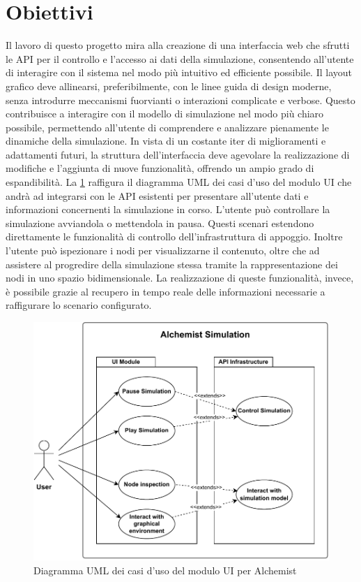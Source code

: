 \section{Obiettivi}
Il lavoro di questo progetto mira alla creazione di una interfaccia web che sfrutti le \ac{API} per il controllo e l'accesso ai dati della simulazione, consentendo all'utente di interagire con il sistema nel modo più intuitivo ed efficiente possibile. Il layout grafico deve allinearsi, preferibilmente, con le linee guida di design moderne, senza introdurre meccanismi fuorvianti o interazioni complicate e verbose. Questo contribuisce a interagire con il modello di simulazione nel modo più chiaro possibile, permettendo all'utente di comprendere e analizzare pienamente le dinamiche della simulazione.
In vista di un costante iter di miglioramenti e adattamenti futuri, la struttura dell'interfaccia deve agevolare la realizzazione di modifiche e l'aggiunta di nuove funzionalità, offrendo un ampio grado di espandibilità.
La \cref{fig:use-cases} raffigura il diagramma UML dei casi d'uso del modulo UI che andrà ad integrarsi con le \ac{API} esistenti per presentare all'utente dati e informazioni concernenti la simulazione in corso. L'utente può controllare la simulazione avviandola o mettendola in pausa. Questi scenari estendono direttamente le funzionalità di controllo dell'infrastruttura di appoggio. Inoltre l'utente può ispezionare i nodi per visualizzarne il contenuto, oltre che ad assistere al progredire della simulazione stessa tramite la rappresentazione dei nodi in uno spazio bidimensionale. La realizzazione di queste funzionalità, invece, è possibile grazie al recupero in tempo reale delle informazioni necessarie a raffigurare lo scenario configurato.
\begin{figure}[htb]
	\centering
	\includegraphics[width=.8\linewidth]{imgs/Use_cases.pdf}
	\caption{Diagramma UML dei casi d'uso del modulo UI per Alchemist}
	\label{fig:use-cases}
\end{figure}

